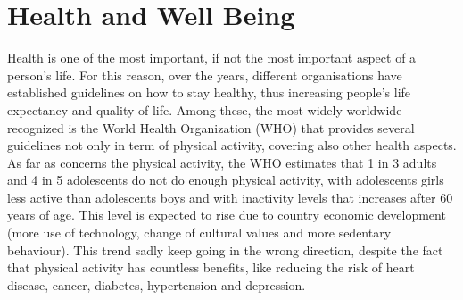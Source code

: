 \setcounter{section}{0}
\section{Health and Well Being}
Health is one of the most important, if not the most important aspect of a person's life. For this reason, over the years, different organisations have established guidelines on how to stay healthy, thus increasing people's life expectancy and quality of life. Among these, the most widely worldwide recognized is the World Health Organization (WHO) \cite{Who} that provides several guidelines not only in term of physical activity, covering also other health aspects. \newline As far as concerns the physical activity, the WHO estimates that 1 in 3 adults and 4 in 5 adolescents do not do enough physical activity, with adolescents girls less active than adolescents boys and with inactivity levels that increases after 60 years of age. This level is expected to rise due to country economic development (more use of technology, change of cultural values and more sedentary behaviour). This trend sadly keep going in the wrong direction, despite the fact that physical activity has countless benefits, like reducing the risk of heart disease, cancer, diabetes, hypertension and depression.
